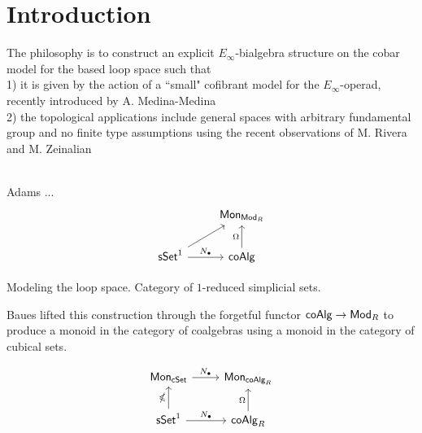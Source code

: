 \section{Introduction}

The philosophy is to construct an explicit $E_{\infty}$-bialgebra structure on the cobar model for the based loop space such that
\\
1) it is given by the action of a ``small" cofibrant model for the $E_{\infty}$-operad, recently introduced by A. Medina-Medina
\\
2) the topological applications include general spaces with arbitrary fundamental group and no finite type assumptions using the recent observations of M. Rivera and M. Zeinalian 

\ \\

Adams ...
\begin{equation*}
\begin{tikzcd}
& \Mon_{\Ch} \\
\sSet^1 \arrow[ru] \arrow[r, "\chains"] & \coAlg \arrow[u, "\cobar"]
\end{tikzcd}
\end{equation*}

Modeling the loop space. Category of $1$-reduced simplicial sets.

Baues lifted this construction through the forgetful functor $\mathsf{coAlg} \to \mathsf{Mod}_R$ to produce a monoid in the category of coalgebras using a monoid in the category of cubical sets.

\begin{equation*}
\begin{tikzcd}
\Mon_{\cSet} \arrow[r, "\chains"] & \Mon_{\coAlg_R} \\
\sSet^1 \arrow[r, "\chains"] \arrow[u, "\gcobar"] & \coAlg_R \arrow[u, "\cobar"]
\end{tikzcd}
\end{equation*}

